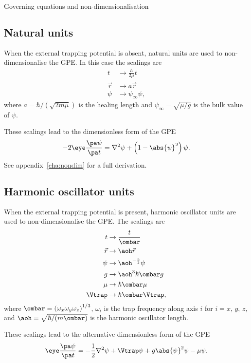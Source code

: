 \begin{chapter}{\label{cha:equations}Governing equations and
  non-dimensionalisation}
  \subsection{Natural units}
  When the external trapping potential is absent, natural units are used to
  non-dimensionalise the GPE.  In this case the scalings are
  \begin{equation*}
    \begin{aligned}
      t       &\to \frac{\hbar}{2\mu}t \\
      \vec{r} &\to a\vec{r} \\
      \psi    &\to \psi_{\infty} \psi,
    \end{aligned}
  \end{equation*}
  where $a = \hbar/(\sqrt{2m\mu})$ is the healing length and $\psi_{\infty} =
  \sqrt{\mu/g}$ is the bulk value of $\psi$.

  These scalings lead to the dimensionless form of the GPE
  \begin{equation*}
    -2\eye\frac{\pa \psi}{\pa t} = \nabla^{2}\psi + \left(1 -
    \abs{\psi}^{2}\right)\psi.
  \end{equation*}
  See appendix~\ref{cha:nondim} for a full derivation.

  \subsection{Harmonic oscillator units}
  When the external trapping potential is present, harmonic oscillator units
  are used to non-dimensionalise the GPE.  The scalings are
  \begin{equation*}
    \begin{aligned}
      t       &\to \frac{t}{\ombar} \\
      \vec{r} &\to \aoh\vec{r} \\
      \psi    &\to \aoh^{-\frac{3}{2}} \psi \\
      g       &\to \aoh^{3}\hbar\ombar g \\
      \mu     &\to \hbar\ombar\mu \\
      \Vtrap  &\to \hbar\ombar\Vtrap,
    \end{aligned}
  \end{equation*}
  where $\ombar = \left( \omega_{x}\omega_{y}\omega_{z}
  \right)^{1/3}$, $\omega_{i}$ is the trap frequency along axis $i$ for $i =
  x$, $y$, $z$, and $\aoh = \sqrt{\hbar/(m\ombar)}$ is the
  harmonic oscillator length.

  These scalings lead to the alternative dimensionless form of the GPE
  \begin{equation*}
    \eye \frac{\pa \psi}{\pa t} = -\frac{1}{2}\nabla^{2}\psi + \Vtrap\psi +
    g\abs{\psi}^{2}\psi - \mu\psi.
  \end{equation*}

\end{chapter}
